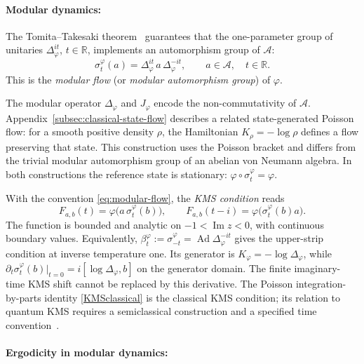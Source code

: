 \documentclass[a4paper,11pt]{article}
\theoremstyle{definition}
\begin{document}
\paragraph{Modular dynamics:}
The Tomita--Takesaki theorem~\cite{Takesaki1970} guarantees that the one-parameter group
of unitaries $\Delta_\varphi^{it}$, $t\in\mathbb{R}$, implements an automorphism group of
$\mathcal{A}$:
\begin{equation}
  \sigma_t^\varphi(a) = \Delta_\varphi^{it}\, a\, \Delta_\varphi^{-it},
  \qquad a\in\mathcal{A},\quad t\in\mathbb{R}.
  \label{eq:modular-flow}
\end{equation}
This is the \emph{modular flow} (or \emph{modular automorphism group}) of $\varphi$. 

The modular operator $\Delta_\varphi$ and $J_\varphi$ encode the non-commutativity of
$\mathcal A$. Appendix~\ref{subsec:classical-state-flow} describes a related
state-generated Poisson flow: for a smooth positive density $\rho$, the Hamiltonian
$K_\rho=-\log\rho$ defines a flow preserving that state. This construction uses
the Poisson bracket and differs from the trivial modular automorphism group of
an abelian von Neumann algebra. In both constructions the reference state is stationary:
$\varphi\circ\sigma_t^\varphi=\varphi$.

With the convention \eqref{eq:modular-flow}, the \emph{KMS condition} reads
\begin{equation}
 F_{a,b}(t)=\varphi\bigl(a\,\sigma_t^\varphi(b)\bigr),
 \qquad F_{a,b}(t-i)=\varphi\bigl(\sigma_t^\varphi(b)a\bigr).
 \label{eq:KMS-function}
\end{equation}
The function is bounded and analytic on $-1<\operatorname{Im}z<0$, with continuous
boundary values. Equivalently, $\beta_t^\varphi:=\sigma_{-t}^\varphi
=\operatorname{Ad}\Delta_\varphi^{-it}$ gives the upper-strip condition at inverse
temperature one. Its generator is $K_\varphi=-\log\Delta_\varphi$, while
$\partial_t\sigma_t^\varphi(b)|_{t=0}=i[\log\Delta_\varphi,b]$ on the generator domain.
The finite imaginary-time KMS shift cannot be replaced by this derivative.
The Poisson integration-by-parts identity \eqref{KMSclassical} is the classical
KMS condition; its relation to quantum KMS requires a semiclassical construction
and a specified time convention~\cite{vanDeVen2022}.

\paragraph{Ergodicity in modular dynamics:}
\end{document}
